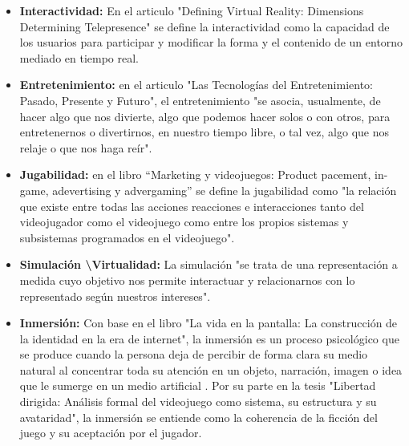 	\begin{itemize}
		\item \textbf{Interactividad:} En el articulo "Defining Virtual Reality:
		 Dimensions Determining Telepresence" se define la interactividad como la 
		 capacidad de los usuarios para participar y modificar la forma y el contenido 
		 de un entorno mediado en tiempo real\cite{RefInteractividad}.  
		
		\item \textbf{Entretenimiento:} en el articulo "Las Tecnologías del
		 Entretenimiento: Pasado, Presente y Futuro", el entretenimiento "se asocia, 
		 usualmente, de hacer algo que nos divierte, algo que podemos hacer solos o con 
		 otros, para entretenernos o divertirnos, en nuestro tiempo libre, o tal vez, 
		 algo que nos relaje o que nos haga reír"\cite{RefEntretenimiento}. 
		
		\item \textbf{Jugabilidad:} en el libro “Marketing y videojuegos: 
	Product pacement, in-game, adevertising y advergaming” se define la jugabilidad 
	como "la relación que existe entre todas las acciones reacciones e interacciones
	 tanto del videojugador como el videojuego como entre los propios sistemas y 
	 subsistemas programados en el videojuego"\cite{RefCarac}.
		
		\item \textbf{Simulación \textbackslash Virtualidad:} La simulación "se trata 
		de una representación a medida cuyo objetivo nos permite interactuar y 
		relacionarnos con lo representado según nuestros intereses"\cite{RefCarac}.
		
		\item \textbf{Inmersión:} Con base en el libro "La vida en la pantalla: La
		 construcción de la identidad en la era de internet", la inmersión es un 
		 proceso psicológico que se produce cuando la persona deja de percibir de 
		 forma clara su medio natural al concentrar toda su atención en un objeto,
		  narración, imagen o idea que le sumerge en un medio artificial 
		  \cite{RefInmersion}. Por su parte en la tesis "Libertad dirigida: Análisis 
		  formal del videojuego como sistema, su estructura y su avataridad", la 
		  inmersión se entiende como la coherencia de la ficción del juego y su 
		  aceptación por el jugador.\cite{refInmersionNavarro}  
	\end{itemize}
		
